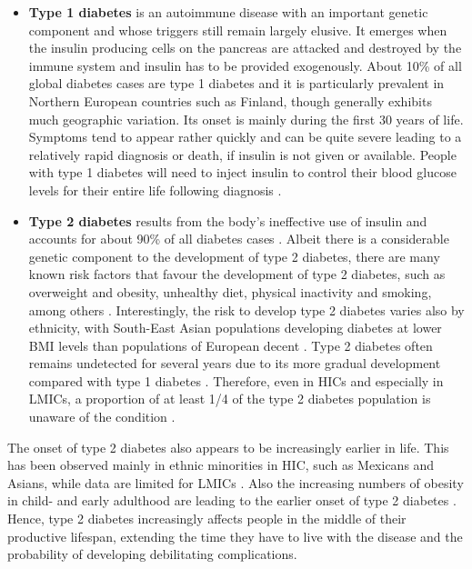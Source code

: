 \begin{itemize}
\item \textbf{Type 1 diabetes} is an autoimmune disease with an important genetic component and whose triggers still remain largely elusive. It emerges when the insulin producing cells on the pancreas are attacked and destroyed by the immune system and insulin has to be provided exogenously. About 10\% of all global diabetes cases are type 1 diabetes and it is particularly prevalent in Northern European countries such as Finland, though generally exhibits much geographic variation. Its onset is mainly during the first 30 years of life. Symptoms tend to appear rather quickly and can be quite severe leading to a relatively rapid diagnosis or death, if insulin is not given or available. People with type 1 diabetes will need to inject insulin to control their blood glucose levels for their entire life following diagnosis \parencite{Tuomilehto2013}. 
\item \textbf{Type 2 diabetes} results from the body's ineffective use of insulin and accounts for about 90\% of all diabetes cases \parencite{WorldHealthOrganization2016}. Albeit there is a considerable genetic component to the development of type 2 diabetes, there are many known risk factors that favour the development of type 2 diabetes, such as overweight and obesity, unhealthy diet, physical inactivity and smoking, among others \parencite{WorldHealthOrganization2016, AmericanDiabetesAssociation2014}. Interestingly, the risk to develop type 2 diabetes varies also by ethnicity, with South-East Asian populations developing diabetes at lower \ac{BMI} levels than populations of European decent \parencite{Ramachandran2010}. Type 2 diabetes often remains undetected for several years due to its more gradual development compared with type 1 diabetes \parencite{AmericanDiabetesAssociation2014}. Therefore, even in \acp{HIC} and especially in \acp{LMIC}, a proportion of at least 1/4 of the type 2 diabetes population is unaware of the condition \parencite{Beagley2014}. 
\end{itemize}

The onset of type 2 diabetes also appears to be increasingly earlier in life. This has been observed mainly in ethnic minorities in \acs{HIC}, such as Mexicans and Asians, while data are limited for \acp{LMIC} \parencite{FazeliFarsani2013}. Also the increasing numbers of obesity in child- and early adulthood are leading to the earlier onset of type 2 diabetes \parencite{Chen2012}. Hence, type 2 diabetes increasingly affects people in the middle of their productive lifespan, extending the time they have to live with the disease and the probability of developing debilitating complications.

